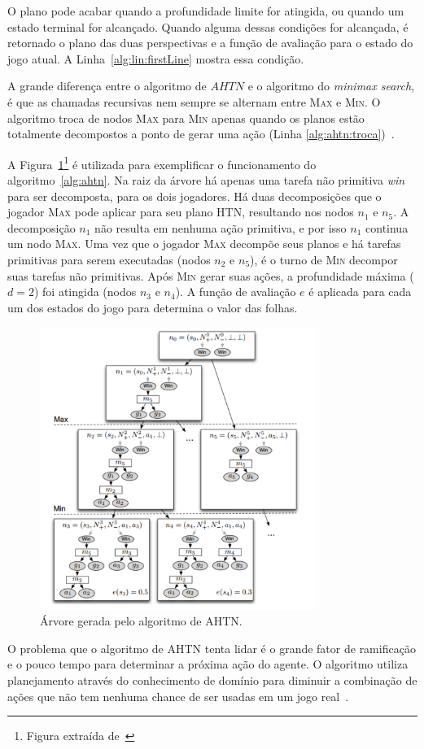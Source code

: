 O plano pode acabar quando a profundidade limite for atingida, ou quando um estado terminal for alcançado.
Quando alguma dessas condições for alcançada, é retornado o plano das duas perspectivas e a função de avaliação para o estado do jogo atual. A Linha~\ref{alg:lin:firstLine} mostra essa condição.

A grande diferença entre o algoritmo de $AHTN$ e o algoritmo do \textit{minimax search}, é que as chamadas recursivas nem sempre se alternam entre \textsc{Max} e \textsc{Min}. 
O algoritmo troca de nodos \textsc{Max} para \textsc{Min} apenas quando os planos estão totalmente decompostos a ponto de gerar uma ação (Linha \ref{alg:ahtn:troca})~\cite{ontanon2015adversarial}.

A Figura~\ref{fig:ahtn}\footnote{Figura extraída de~\cite{ontanon2015adversarial}} é utilizada para exemplificar o funcionamento do algoritmo~\ref{alg:ahtn}. 
Na raiz da árvore há apenas uma tarefa não primitiva \textit{win} para ser decomposta, para os dois jogadores. 
Há duas decomposições que o jogador \textsc{Max} pode aplicar para seu plano HTN, resultando nos nodos $n_{1}$ e $n_{5}$. A decomposição $n_{1}$ não resulta em nenhuma ação primitiva, e por isso $n_{1}$ continua um nodo \textsc{Max}. Uma vez que o jogador \textsc{Max} decompõe seus planos e há tarefas primitivas para serem executadas (nodos $n_{2}$ e $n_{5}$), é o turno de \textsc{Min} decompor suas tarefas não primitivas. Após \textsc{Min} gerar suas ações, a profundidade máxima ($d = 2$) foi atingida (nodos $n_{3}$ e $n_{4}$). 
A função de avaliação $e$ é aplicada para cada um dos estados do jogo para determina o valor das folhas.

\begin{figure}[ht]
	\centering
	\includegraphics[width=0.8\textwidth]{fig/ahtn.pdf} 
	\caption{Árvore gerada pelo algoritmo de AHTN.}
	\label{fig:ahtn}
\end{figure}

O problema que o algoritmo de AHTN tenta lidar é o grande fator de ramificação e o pouco tempo para determinar a próxima ação do agente. O algoritmo utiliza planejamento através do conhecimento de domínio para diminuir a combinação de ações que não tem nenhuma chance de ser usadas em um jogo real~\cite{ontanon2015adversarial}. 
